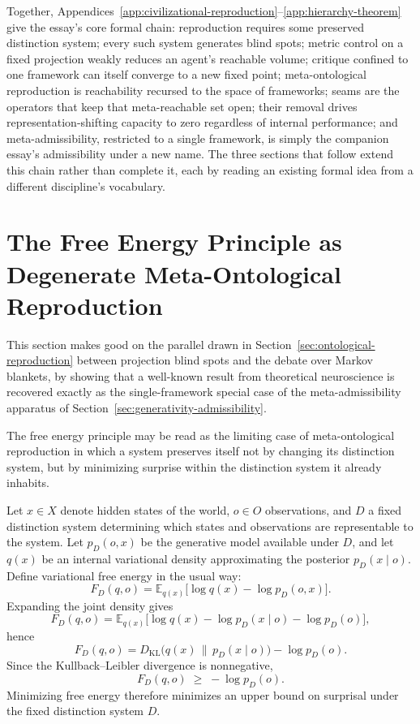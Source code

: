 \documentclass[11pt]{article}
\theoremstyle{plain}
\begin{document}
\noindent Together, Appendices~\ref{app:civilizational-reproduction}--\ref{app:hierarchy-theorem} give the essay's core formal chain: reproduction requires some preserved distinction system; every such system generates blind spots; metric control on a fixed projection weakly reduces an agent's reachable volume; critique confined to one framework can itself converge to a new fixed point; meta-ontological reproduction is reachability recursed to the space of frameworks; seams are the operators that keep that meta-reachable set open; their removal drives representation-shifting capacity to zero regardless of internal performance; and meta-admissibility, restricted to a single framework, is simply the companion essay's admissibility under a new name. The three sections that follow extend this chain rather than complete it, each by reading an existing formal idea from a different discipline's vocabulary.

\section{The Free Energy Principle as Degenerate Meta-Ontological Reproduction}
\label{app:free-energy}

\noindent This section makes good on the parallel drawn in Section~\ref{sec:ontological-reproduction} between projection blind spots and the debate over Markov blankets, by showing that a well-known result from theoretical neuroscience is recovered exactly as the single-framework special case of the meta-admissibility apparatus of Section~\ref{sec:generativity-admissibility}.

The free energy principle may be read as the limiting case of meta-ontological reproduction in which a system preserves itself not by changing its distinction system, but by minimizing surprise within the distinction system it already inhabits.

Let $x \in X$ denote hidden states of the world, $o \in O$ observations, and $D$ a fixed distinction system determining which states and observations are representable to the system. Let $p_D(o,x)$ be the generative model available under $D$, and let $q(x)$ be an internal variational density approximating the posterior $p_D(x \mid o)$. Define variational free energy in the usual way:
\[
F_D(q,o) = \mathbb{E}_{q(x)}\big[\log q(x) - \log p_D(o,x)\big].
\]
Expanding the joint density gives
\[
F_D(q,o) = \mathbb{E}_{q(x)}\big[\log q(x) - \log p_D(x \mid o) - \log p_D(o)\big],
\]
hence
\[
F_D(q,o) = D_{\mathrm{KL}}\big(q(x) \,\|\, p_D(x \mid o)\big) - \log p_D(o).
\]
Since the Kullback--Leibler divergence is nonnegative,
\[
F_D(q,o) \;\geq\; -\log p_D(o).
\]
Minimizing free energy therefore minimizes an upper bound on surprisal under the fixed distinction system $D$.
\end{document}
